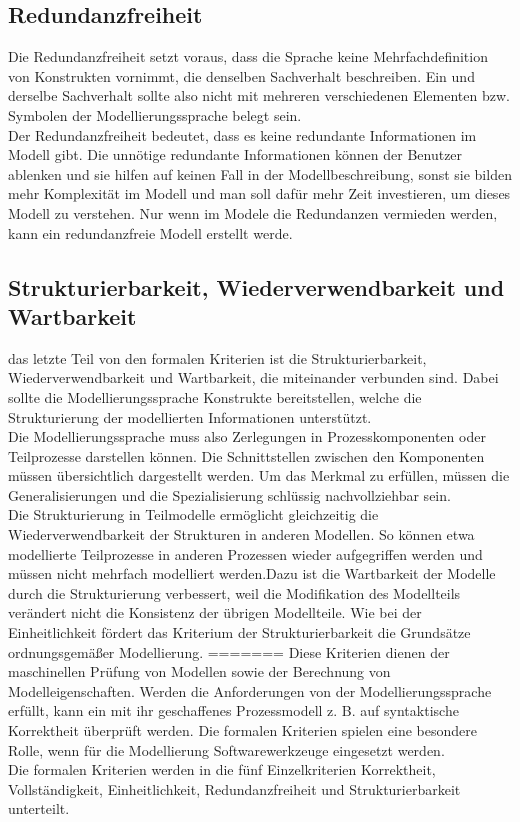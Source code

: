 \subsection{Redundanzfreiheit}
Die Redundanzfreiheit setzt voraus, dass die Sprache keine Mehrfachdefinition von Konstrukten vornimmt, die denselben Sachverhalt beschreiben. Ein und derselbe Sachverhalt sollte also nicht mit mehreren verschiedenen Elementen bzw. Symbolen der Modellierungssprache belegt sein.\cite{MT007}\\
Der Redundanzfreiheit bedeutet, dass es keine redundante Informationen im Modell gibt. Die unnötige redundante Informationen können der Benutzer ablenken und sie hilfen auf keinen Fall in der Modellbeschreibung, sonst sie bilden mehr Komplexität im Modell und man soll dafür mehr Zeit investieren, um dieses Modell zu verstehen.
Nur wenn im Modele die Redundanzen vermieden werden, kann ein
redundanzfreie Modell erstellt werde.
\subsection{Strukturierbarkeit, Wiederverwendbarkeit und Wartbarkeit}
das letzte Teil von den formalen Kriterien ist die Strukturierbarkeit, Wiederverwendbarkeit und Wartbarkeit, die miteinander verbunden sind. Dabei sollte die Modellierungssprache Konstrukte bereitstellen, welche die Strukturierung der modellierten Informationen unterstützt.\\
Die Modellierungssprache muss also Zerlegungen in Prozesskomponenten oder Teilprozesse darstellen können. Die Schnittstellen zwischen den Komponenten müssen übersichtlich dargestellt werden.\cite{MT002}
Um das Merkmal zu erfüllen, müssen die Generalisierungen und die Spezialisierung schlüssig nachvollziehbar sein.\\
Die Strukturierung in Teilmodelle ermöglicht gleichzeitig die Wiederverwendbarkeit der Strukturen in anderen Modellen. So können etwa modellierte Teilprozesse in anderen Prozessen wieder aufgegriffen werden und müssen nicht mehrfach modelliert werden.\cite{MT007}Dazu ist die Wartbarkeit der Modelle durch die Strukturierung verbessert, weil die Modifikation des Modellteils verändert nicht die Konsistenz der übrigen Modellteile.
Wie bei der Einheitlichkeit fördert das Kriterium der Strukturierbarkeit die Grundsätze ordnungsgemäßer Modellierung.
=======
\label{sc:FormaleKriterien}
Diese Kriterien dienen der maschinellen Prüfung von Modellen sowie der Berechnung von Modelleigenschaften. Werden die Anforderungen von der Modellierungssprache erfüllt, kann ein mit ihr geschaffenes Prozessmodell z. B. auf syntaktische Korrektheit überprüft werden. Die formalen Kriterien spielen eine besondere Rolle, wenn für die Modellierung Softwarewerkzeuge eingesetzt werden.\cite{MT007} \\
Die formalen Kriterien werden in die fünf Einzelkriterien Korrektheit, Vollständigkeit, Einheitlichkeit, Redundanzfreiheit und Strukturierbarkeit unterteilt.
